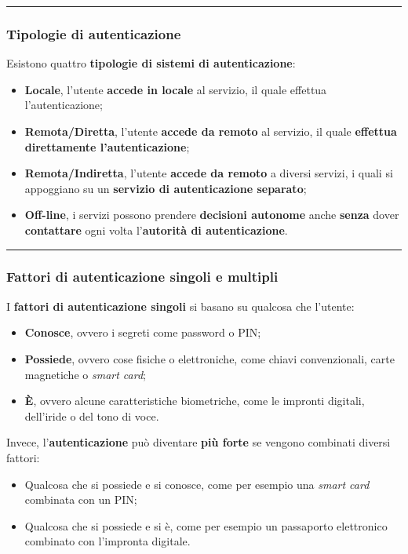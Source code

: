 \documentclass[a4paper]{article}
\newcommand{\longline}{\noindent\rule{\textwidth}{0.4pt}}
\begin{document}
	\longline
	
	\subsubsection{Tipologie di autenticazione}
	
	Esistono quattro \textbf{tipologie di sistemi di autenticazione}:
	\begin{itemize}
		\item \textcolor{Red3}{\textbf{Locale}}, l'utente \textbf{accede in locale} al servizio, il quale effettua l'autenticazione;
		
		\item \textcolor{Red3}{\textbf{Remota/Diretta}}, l'utente \textbf{accede da remoto} al servizio, il quale \textbf{effettua direttamente l'autenticazione};
		
		\item \textcolor{Red3}{\textbf{Remota/Indiretta}}, l'utente \textbf{accede da remoto} a diversi servizi, i quali si appoggiano su un \textbf{servizio di autenticazione separato};
		
		\item \textcolor{Red3}{\textbf{Off-line}}, i servizi possono prendere \textbf{decisioni autonome} anche \textbf{senza} dover \textbf{contattare} ogni volta l'\textbf{autorità di autenticazione}.
	\end{itemize}
	
	\longline
	
	\subsubsection{Fattori di autenticazione singoli e multipli}
	
	I \textbf{fattori di autenticazione singoli} si basano su qualcosa che l'utente:
	\begin{itemize}
		\item \textcolor{Red3}{\textbf{Conosce}}, ovvero i segreti come password o PIN;
		
		\item \textcolor{Red3}{\textbf{Possiede}}, ovvero cose fisiche o elettroniche, come chiavi convenzionali, carte magnetiche o \emph{smart card};
		
		\item \textcolor{Red3}{\textbf{È}}, ovvero alcune caratteristiche biometriche, come le impronti digitali, dell'iride o del tono di voce.
	\end{itemize}
	Invece, l'\textbf{autenticazione} può diventare \textbf{più forte} se vengono combinati diversi fattori:
	\begin{itemize}
		\item Qualcosa che si possiede e si conosce, come per esempio una \emph{smart card} combinata con un PIN;
		
		\item Qualcosa che si possiede e si è, come per esempio un passaporto elettronico combinato con l'impronta digitale.
	\end{itemize}\newpage
	
\end{document}
